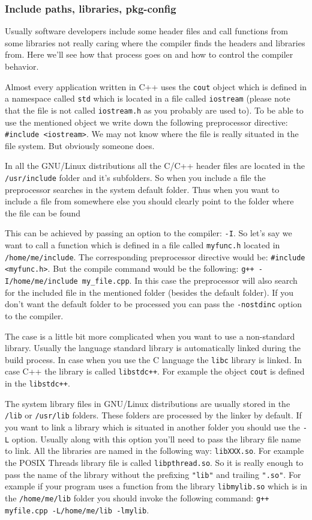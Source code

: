 \subsubsection{Include paths, libraries, pkg-config}
\label {inc_lib_pkgconfig}
Usually software developers include some header files and call functions from some libraries not really caring where the compiler finds the headers and libraries from. Here we'll see how that process goes on and how to control the compiler behavior.

Almost every application written in C++ uses the {\tt cout} object which is defined in a namespace called {\tt std} which is located in a file called {\tt iostream} (please note that the file is not called {\tt iostream.h} as you probably are used to). To be able to use the mentioned object we write down the following preprocessor directive: {\tt \#include <iostream>}. We may not know where the file is really situated in the file system. But obviously someone does. 

In all the GNU/Linux distributions all the C/C++ header files are located in the {\tt /usr/include} folder and it's subfolders. So when you include a file the preprocessor searches in the system default folder. Thus when you want to include a file from somewhere else you should clearly point to the folder where the file can be found

This can be achieved by passing an option to the compiler: {\tt -I}. So let's say we want to call a function which is defined in a file called {\tt myfunc.h} located in {\tt /home/me/include}. The corresponding preprocessor directive would be: {\tt \#include <myfunc.h>}. But the compile command would be the following: {\tt g++ -I/home/me/include my\_file.cpp}. In this case the preprocessor will also search for the included file in the mentioned folder (besides the default folder). If you don't want the default folder to be processed you can pass the {\tt -nostdinc} option to the compiler.

The case is a little bit more complicated when you want to use a non-standard library. Usually the language standard library is automatically linked during the build process. In case when you use the C language the {\tt libc} library is linked. In case C++ the library is called {\tt libstdc++}. For example the object {\tt cout} is defined in the {\tt libstdc++}.

The system library files in GNU/Linux distributions are usually stored in the {\tt /lib} or {\tt /usr/lib} folders. These folders are processed by the linker by default. If you want to link a library which is situated in another folder you should use the {\tt -L} option. Usually along with this option you'll need to pass the library file name to link. All the libraries are named in the following way: {\tt libXXX.so}. For example the POSIX Threads library file is called {\tt libpthread.so}. So it is really enough to pass the name of the library without the prefixing {\tt "lib"} and trailing {\tt ".so"}. For example if your program uses a function from the library {\tt libmylib.so} which is in the {\tt /home/me/lib} folder you should invoke the following command: {\tt g++ myfile.cpp -L/home/me/lib -lmylib}. 

